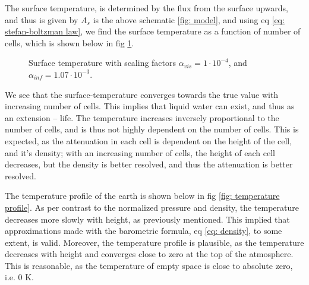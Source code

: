 \documentclass[a4paper]{article}
\newcommand{\newparagraph}{\vspace{.5cm}\noindent}
\begin{document}
\newparagraph
The surface temperature, is determined by the flux from the surface upwards, and thus is given by $A_s$ is the above schematic \ref{fig: model}, and using eq \eqref{eq: stefan-boltzman law}, we find the surface temperature as a function of number of cells, which is shown below in fig \ref{fig: surface temperature}.
\begin{figure}[H]
    \centering
    \caption{Surface temperature with scaling factors $\alpha_{vis} = 1\cdot10^{-4}$, and $\alpha_{inf} = 1.07\cdot10^{-3}$.}
    \label{fig: surface temperature}
\end{figure}\noindent
We see that the surface-temperature converges towards the true value with increasing number of cells.
This implies that liquid water can exist, and thus as an extension -- life.
The temperature increases inversely proportional to the number of cells, and is thus not highly dependent on the number of cells.
This is expected, as the attenuation in each cell is dependent on the height of the cell, and it's density;
with an increasing number of cells, the height of each cell decreases, but the density is better resolved, and thus the attenuation is better resolved.

\newparagraph
The temperature profile of the earth is shown below in fig \ref{fig: temperature profile}.
As per contrast to the normalized pressure and density, the temperature decreases more slowly with height, as previously mentioned.
This implied that approximations made with the barometric formula, eq \eqref{eq: density}, to some extent, is valid.
Moreover, the temperature profile is plausible, as the temperature decreases with height and converges close to zero at the top of the atmosphere.
This is reasonable, as the temperature of empty space is close to absolute zero, i.e. $0$ K.
\end{document}
